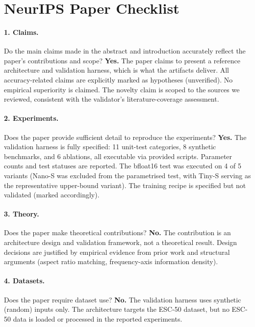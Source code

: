\documentclass{article}
\begin{document}
\newpage
\section*{NeurIPS Paper Checklist}

\paragraph{1. Claims.}
Do the main claims made in the abstract and introduction accurately reflect the
paper's contributions and scope?
\textbf{Yes.} The paper claims to present a reference architecture and
validation harness, which is what the artifacts deliver. All accuracy-related
claims are explicitly marked as hypotheses (unverified). No empirical
superiority is claimed. The novelty claim is scoped to the sources we reviewed,
consistent with the validator's literature-coverage assessment.

\paragraph{2. Experiments.}
Does the paper provide sufficient detail to reproduce the experiments?
\textbf{Yes.} The validation harness is fully specified: 11 unit-test categories,
8 synthetic benchmarks, and 6 ablations, all executable via provided scripts.
Parameter counts and test statuses are reported. The bfloat16 test was executed
on 4 of 5 variants (Nano-S was excluded from the parametrised test, with Tiny-S
serving as the representative upper-bound variant). The training recipe is
specified but not validated (marked accordingly).

\paragraph{3. Theory.}
Does the paper make theoretical contributions?
\textbf{No.} The contribution is an architecture design and validation framework,
not a theoretical result. Design decisions are justified by empirical evidence
from prior work and structural arguments (aspect ratio matching, frequency-axis
information density).

\paragraph{4. Datasets.}
Does the paper require dataset use?
\textbf{No.} The validation harness uses synthetic (random) inputs only. The
architecture targets the ESC-50 dataset, but no ESC-50 data is loaded or
processed in the reported experiments.
\end{document}
